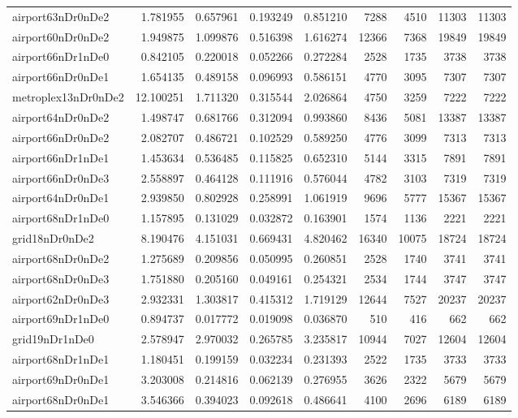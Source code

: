 \begin{longtable}{|l|r|r|r|r|r|r|r|r|}
airport63nDr0nDe2 & 1.781955 & 0.657961 & 0.193249 & 0.851210 & 7288 & 4510 & 11303 & 11303 \\
airport60nDr0nDe2 & 1.949875 & 1.099876 & 0.516398 & 1.616274 & 12366 & 7368 & 19849 & 19849 \\
airport66nDr1nDe0 & 0.842105 & 0.220018 & 0.052266 & 0.272284 & 2528 & 1735 & 3738 & 3738 \\
airport66nDr0nDe1 & 1.654135 & 0.489158 & 0.096993 & 0.586151 & 4770 & 3095 & 7307 & 7307 \\
metroplex13nDr0nDe2 & 12.100251 & 1.711320 & 0.315544 & 2.026864 & 4750 & 3259 & 7222 & 7222 \\
airport64nDr0nDe2 & 1.498747 & 0.681766 & 0.312094 & 0.993860 & 8436 & 5081 & 13387 & 13387 \\
airport66nDr0nDe2 & 2.082707 & 0.486721 & 0.102529 & 0.589250 & 4776 & 3099 & 7313 & 7313 \\
airport66nDr1nDe1 & 1.453634 & 0.536485 & 0.115825 & 0.652310 & 5144 & 3315 & 7891 & 7891 \\
airport66nDr0nDe3 & 2.558897 & 0.464128 & 0.111916 & 0.576044 & 4782 & 3103 & 7319 & 7319 \\
airport64nDr0nDe1 & 2.939850 & 0.802928 & 0.258991 & 1.061919 & 9696 & 5777 & 15367 & 15367 \\
airport68nDr1nDe0 & 1.157895 & 0.131029 & 0.032872 & 0.163901 & 1574 & 1136 & 2221 & 2221 \\
grid18nDr0nDe2 & 8.190476 & 4.151031 & 0.669431 & 4.820462 & 16340 & 10075 & 18724 & 18724 \\
airport68nDr0nDe2 & 1.275689 & 0.209856 & 0.050995 & 0.260851 & 2528 & 1740 & 3741 & 3741 \\
airport68nDr0nDe3 & 1.751880 & 0.205160 & 0.049161 & 0.254321 & 2534 & 1744 & 3747 & 3747 \\
airport62nDr0nDe3 & 2.932331 & 1.303817 & 0.415312 & 1.719129 & 12644 & 7527 & 20237 & 20237 \\
airport69nDr1nDe0 & 0.894737 & 0.017772 & 0.019098 & 0.036870 & 510 & 416 & 662 & 662 \\
grid19nDr1nDe0 & 2.578947 & 2.970032 & 0.265785 & 3.235817 & 10944 & 7027 & 12604 & 12604 \\
airport68nDr1nDe1 & 1.180451 & 0.199159 & 0.032234 & 0.231393 & 2522 & 1735 & 3733 & 3733 \\
airport69nDr0nDe1 & 3.203008 & 0.214816 & 0.062139 & 0.276955 & 3626 & 2322 & 5679 & 5679 \\
airport68nDr0nDe1 & 3.546366 & 0.394023 & 0.092618 & 0.486641 & 4100 & 2696 & 6189 & 6189 \\

\end{longtable}

